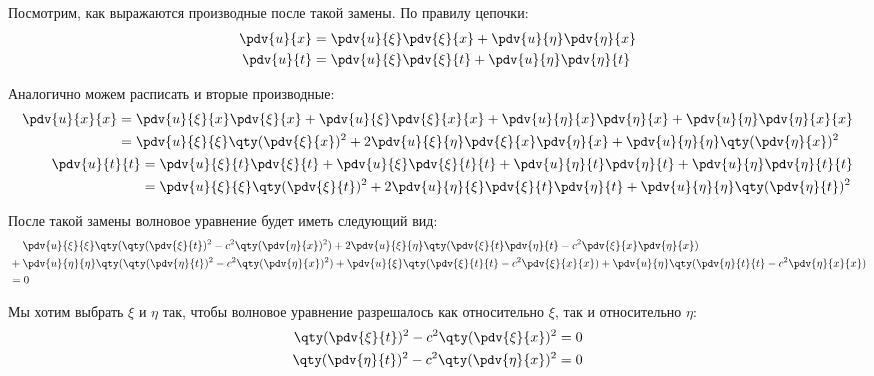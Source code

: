Посмотрим, как выражаются производные после такой замены. По правилу цепочки:
%
\begin{equation}
  \begin{aligned}
    \pdv{u}{x} &= \pdv{u}{\xi} \pdv{\xi}{x} + \pdv{u}{\eta} \pdv{\eta}{x} \\
    \pdv{u}{t} &= \pdv{u}{\xi} \pdv{\xi}{t} + \pdv{u}{\eta} \pdv{\eta}{t}
  \end{aligned}
\end{equation}

Аналогично можем расписать и вторые производные:
%
\begin{align*}
  \begin{aligned}
    \pdv{u}{x}{x}
    &= \pdv{u}{\xi}{x} \pdv{\xi}{x} + \pdv{u}{\xi} \pdv{\xi}{x}{x} + \pdv{u}{\eta}{x} \pdv{\eta}{x} + \pdv{u}{\eta} \pdv{\eta}{x}{x} \\
    &= \pdv{u}{\xi}{\xi} \qty(\pdv{\xi}{x})^2 + 2 \pdv{u}{\xi}{\eta} \pdv{\xi}{x} \pdv{\eta}{x} + \pdv{u}{\eta}{\eta} \qty(\pdv{\eta}{x})^2
  \end{aligned} \\
  \begin{aligned}
    \pdv{u}{t}{t}
    &= \pdv{u}{\xi}{t} \pdv{\xi}{t} + \pdv{u}{\xi} \pdv{\xi}{t}{t} + \pdv{u}{\eta}{t} \pdv{\eta}{t} + \pdv{u}{\eta} \pdv{\eta}{t}{t} \\
    &= \pdv{u}{\xi}{\xi} \qty(\pdv{\xi}{t})^2 + 2 \pdv{u}{\eta}{\xi} \pdv{\xi}{t} \pdv{\eta}{t} + \pdv{u}{\eta}{\eta} \qty(\pdv{\eta}{t})^2
  \end{aligned}
\end{align*}

После такой замены волновое уравнение будет иметь следующий вид:
%
\begin{equation*}
  \begin{aligned}
    &\phantom{{}+{}} \pdv{u}{\xi}{\xi} \qty(\qty(\pdv{\xi}{t})^2 - c^2 \qty(\pdv{\eta}{x})^2) + 2 \pdv{u}{\xi}{\eta} \qty(\pdv{\xi}{t} \pdv{\eta}{t} - c^2 \pdv{\xi}{x} \pdv{\eta}{x}) \\
    &+ \pdv{u}{\eta}{\eta} \qty(\qty(\pdv{\eta}{t})^2 - c^2 \qty(\pdv{\eta}{x})^2) + \pdv{u}{\xi} \qty(\pdv{\xi}{t}{t} - c^2 \pdv{\xi}{x}{x}) + \pdv{u}{\eta} \qty(\pdv{\eta}{t}{t} - c^2 \pdv{\eta}{x}{x}) \\
    &= 0
  \end{aligned}
  \label{lecture2-wave-reformulated}
\end{equation*}

Мы хотим выбрать $\xi$ и $\eta$ так, чтобы волновое уравнение разрешалось как относительно $\xi$, так и относительно $\eta$:
%
\begin{align*}
  \qty(\pdv{\xi}{t})^2 - c^2 \qty(\pdv{\xi}{x})^2 = 0 \\
  \qty(\pdv{\eta}{t})^2 - c^2 \qty(\pdv{\eta}{x})^2 = 0
\end{align*}

